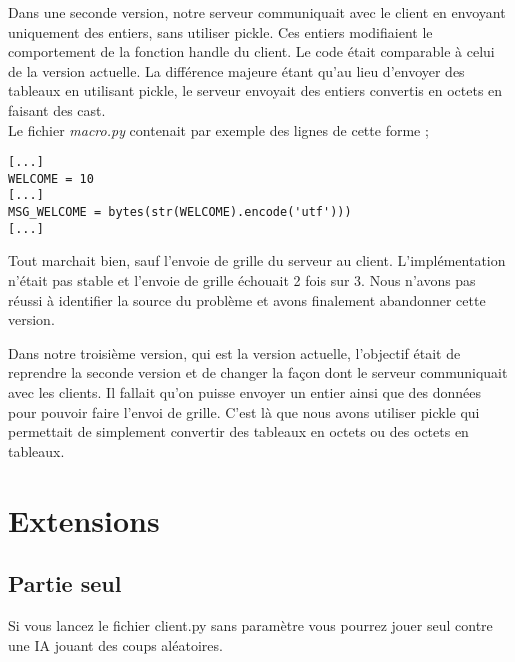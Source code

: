\documentclass[11pt]{report}
\begin{document}
\vspace{5mm}
\par

Dans une seconde version, notre serveur communiquait avec le client en envoyant
uniquement des entiers, sans utiliser pickle. Ces entiers modifiaient le
comportement de la fonction handle du client. Le code était comparable à
celui de la version actuelle. La différence majeure étant qu'au lieu d'envoyer
des tableaux en utilisant pickle, le serveur envoyait des entiers convertis
en octets en faisant des cast. \\
Le fichier \textit{macro.py} contenait par exemple des lignes de cette forme ;

\begin{verbatim}
[...]
WELCOME = 10
[...]
MSG_WELCOME = bytes(str(WELCOME).encode('utf')))
[...]
\end{verbatim}

Tout marchait bien, sauf l'envoie de grille du serveur au client.
L'implémentation n'était pas stable et l'envoie de grille échouait
2 fois sur 3. Nous n'avons pas réussi à identifier la source du problème et
avons finalement abandonner cette version.

\vspace{5mm}
\par

Dans notre troisième version, qui est la version actuelle, l'objectif était
de reprendre la seconde version et de changer la façon dont le serveur
communiquait avec les clients. Il fallait qu'on puisse envoyer un entier ainsi
que des données pour pouvoir faire l'envoi de grille. C'est là que nous avons
utiliser pickle qui permettait de simplement convertir des tableaux en octets
ou des octets en tableaux.


\section{Extensions}

\subsection*{Partie seul}

Si vous lancez le fichier client.py sans paramètre vous pourrez jouer seul
contre une IA jouant des coups aléatoires.
\end{document}
